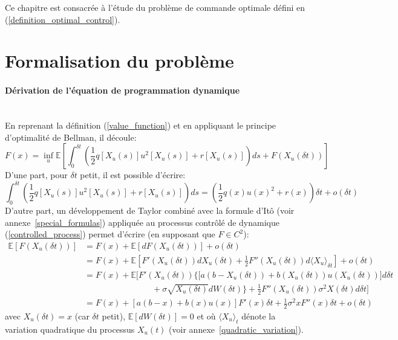 \label{sec:Optimal_Control}
Ce chapitre est consacrée à l'étude du problème de commande optimale défini en (\ref{definition_optimal_control}).
\section{Formalisation du problème}
\paragraph{Dérivation de l'équation de programmation dynamique}\phantom{}\\
En reprenant la définition (\ref{value_function}) et en appliquant le principe d'optimalité de Bellman, il découle:
\begin{equation}\label{Bellman_optimality}
        F(x) = \inf_u\mathds{E}\left[\int_0^{\delta t}\left(\frac{1}{2}q\left[X_u(s)\right]u^2\left[X_u(s)\right]+r\left[X_u(s)\right]\right)ds+F(X_u(\delta t))\right]
\end{equation}
D'une part, pour $\delta t$ petit, il est possible d'écrire:
\begin{equation}\label{cost_function_simplification}
    \int_0^{\delta t}\left(\frac{1}{2}q\left[X_u(s)\right]u^2\left[X_u(s)\right]+r\left[X_u(s)\right]\right)ds=\left(\frac{1}{2}q(x){u(x)}^2+r(x)\right)\delta t+o(\delta t)
\end{equation}
D'autre part, un développement de Taylor combiné avec la formule d'Itô (voir annexe~\ref{special_formulas}) appliquée au processus contrôlé de dynamique (\ref{controlled_process}) permet d'écrire (en supposant que $F\in C^2$):
\begin{equation}\label{taylor_ito}
    \begin{aligned}
        \mathds{E}[F(X_u(\delta t))]&=F(x)+\mathds{E}[dF(X_u(\delta t))]+o(\delta t)\\
        &=F(x)+\mathds{E}\left[F'(X_u(\delta t))dX_u(\delta t)+\frac{1}{2}F''(X_u(\delta t))d{\langle X_u\rangle}_{\delta t} \right]+o(\delta t)\\
        &=F(x)+\mathds{E}\Bigg[F'(X_u(\delta t))\bigg\{\Big[a\left(b-X_u(\delta t)\right)+b\left(X_u(\delta t)\right)u\left(X_u(\delta t)\right)\Big]d\delta t\\&\quad\quad\quad\quad\quad\quad\quad\quad+\sigma\sqrt{X_u(\delta t)}dW(\delta t)\bigg\}+\frac{1}{2}F''(X_u(\delta t))\sigma^2X(\delta t)d\delta t\Bigg]\\
        &=F(x)+\left[a(b-x)+b(x)u(x)\right]F'(x)\delta t+\frac{1}{2}\sigma^2xF''(x)\delta t+o(\delta t)
    \end{aligned}
\end{equation}
avec \(X_u(\delta t)=x\) (car \(\delta t\) petit), \(\mathds{E}[dW(\delta t)]=0\) et où \({\langle X_u\rangle}_t\) dénote la variation quadratique du processus \(X_u(t)\) (voir annexe~\ref{quadratic_variation}).

